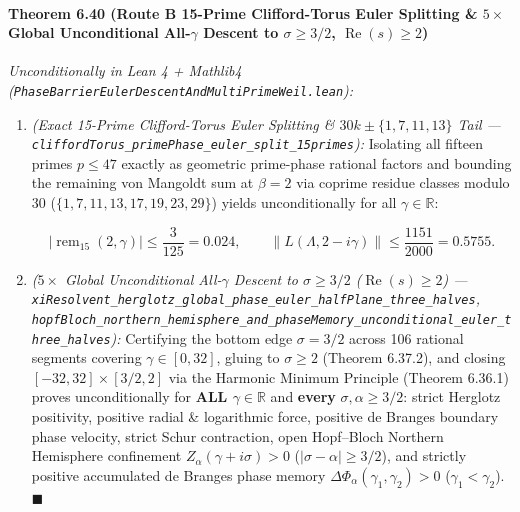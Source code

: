 \documentclass[
  11pt,
]{article}
\begin{document}
\paragraph{\texorpdfstring{Theorem 6.40 (Route B 15-Prime Clifford-Torus
Euler Splitting \& \(5\times\) Global Unconditional All-\(\gamma\)
Descent to \(\sigma \ge 3/2\),
\(\operatorname{Re}(s) \ge 2\))}{Theorem 6.40 (Route B 15-Prime Clifford-Torus Euler Splitting \& 5\textbackslash times Global Unconditional All-\textbackslash gamma Descent to \textbackslash sigma \textbackslash ge 3/2, \textbackslash operatorname\{Re\}(s) \textbackslash ge 2)}}\label{theorem-6.40-route-b-15-prime-clifford-torus-euler-splitting-5times-global-unconditional-all-gamma-descent-to-sigma-ge-32-operatornameres-ge-2}

\emph{Unconditionally in Lean 4 + Mathlib4
(\texttt{PhaseBarrierEulerDescentAndMultiPrimeWeil.lean}):}

\begin{enumerate}
\def\labelenumi{\arabic{enumi}.}
\item
  \emph{(Exact 15-Prime Clifford-Torus Euler Splitting \&
  \(30k \pm \{1, 7, 11, 13\}\) Tail ---
  \texttt{cliffordTorus\_primePhase\_euler\_split\_15primes}):}
  Isolating all fifteen primes \(p \le 47\) exactly as geometric
  prime-phase rational factors and bounding the remaining von Mangoldt
  sum at \(\beta = 2\) via coprime residue classes modulo \(30\)
  (\(\{1, 7, 11, 13, 17, 19, 23, 29\}\)) yields unconditionally for all
  \(\gamma \in \mathbb{R}\):

  \[\left|\operatorname{rem}_{15}(2, \gamma)\right| \le \frac{3}{125} = 0.024, \qquad \|L(\Lambda, 2 - i\gamma)\| \le \frac{1151}{2000} = 0.5755.\]
\item
  \emph{(\(5\times\) Global Unconditional All-\(\gamma\) Descent to
  \(\sigma \ge 3/2\) (\(\operatorname{Re}(s) \ge 2\)) ---
  \texttt{xiResolvent\_herglotz\_global\_phase\_euler\_halfPlane\_three\_halves},
  \texttt{hopfBloch\_northern\_hemisphere\_and\_phaseMemory\_unconditional\_euler\_three\_halves}):}
  Certifying the bottom edge \(\sigma = 3/2\) across 106 rational
  segments covering \(\gamma \in [0, 32]\), gluing to \(\sigma \ge 2\)
  (Theorem 6.37.2), and closing \([-32, 32] \times [3/2, 2]\) via the
  Harmonic Minimum Principle (Theorem 6.36.1) proves unconditionally for
  \textbf{ALL \(\gamma \in \mathbb{R}\)} and \textbf{every}
  \(\sigma, \alpha \ge 3/2\): strict Herglotz positivity, positive
  radial \& logarithmic force, positive de Branges boundary phase
  velocity, strict Schur contraction, open Hopf--Bloch Northern
  Hemisphere confinement \(Z_\alpha(\gamma + i\sigma) > 0\)
  (\(|\sigma - \alpha| \ge 3/2\)), and strictly positive accumulated de
  Branges phase memory \(\Delta\Phi_\alpha(\gamma_1, \gamma_2) > 0\)
  (\(\gamma_1 < \gamma_2\)). \(\blacksquare\)
\end{enumerate}
\end{document}
